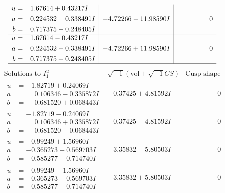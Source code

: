 \documentclass[1p]{elsarticle_modified}
\theoremstyle{definition}
\newcommand{\I}{\sqrt{-1}}
\begin{document}
$$\begin{array}{c|c|c}
\begin{aligned}
u &= \phantom{-}1.67614 + 0.43217 I \\
a &= \phantom{-}0.224532 + 0.338491 I \\
b &= \phantom{-}0.717375 - 0.248405 I\end{aligned}
 & -4.72266 - 11.98590 I & \phantom{-0.000000 } 0 \\ \hline\begin{aligned}
u &= \phantom{-}1.67614 - 0.43217 I \\
a &= \phantom{-}0.224532 - 0.338491 I \\
b &= \phantom{-}0.717375 + 0.248405 I\end{aligned}
 & -4.72266 + 11.98590 I & \phantom{-0.000000 } 0\\
 \hline 
 \end{array}$$\newpage$$\begin{array}{c|c|c}  
\text{Solutions to }I^u_{1}& \I (\text{vol} + \sqrt{-1}CS) & \text{Cusp shape}\\
 \hline 
\begin{aligned}
u &= -1.82719 + 0.24069 I \\
a &= \phantom{-}0.106346 - 0.335872 I \\
b &= \phantom{-}0.681520 + 0.068443 I\end{aligned}
 & -0.37425 + 4.81592 I & \phantom{-0.000000 } 0 \\ \hline\begin{aligned}
u &= -1.82719 - 0.24069 I \\
a &= \phantom{-}0.106346 + 0.335872 I \\
b &= \phantom{-}0.681520 - 0.068443 I\end{aligned}
 & -0.37425 - 4.81592 I & \phantom{-0.000000 } 0 \\ \hline\begin{aligned}
u &= -0.99249 + 1.56960 I \\
a &= -0.365273 + 0.569703 I \\
b &= -0.585277 + 0.714740 I\end{aligned}
 & -3.35832 - 5.80503 I & \phantom{-0.000000 } 0 \\ \hline\begin{aligned}
u &= -0.99249 - 1.56960 I \\
a &= -0.365273 - 0.569703 I \\
b &= -0.585277 - 0.714740 I\end{aligned}
 & -3.35832 + 5.80503 I & \phantom{-0.000000 } 0 \\ \hline\begin{aligned}

\end{aligned}
\end{array}$$
\end{document}
